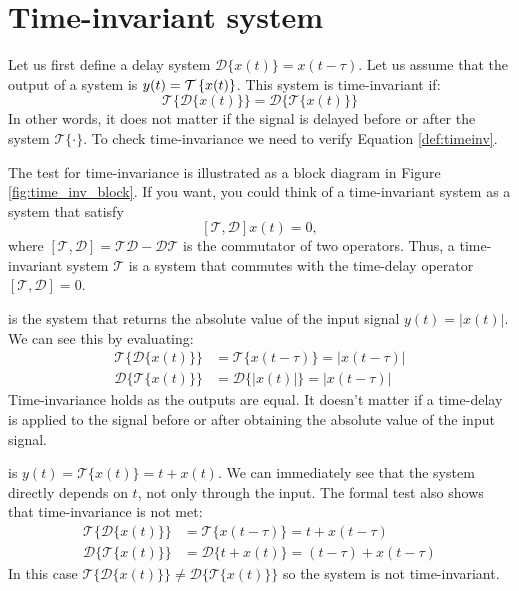 \section{Time-invariant system}

Let us first define a delay system $\mathcal{D}\{x(t)\} = x(t-\tau)$. Let us assume that the output of a system is $y(t) = \spop[x(t)]$. This system is time-invariant if:
\begin{equation}
\boxed{
\mathcal{T}\{\mathcal{D}\{x(t)\}\} = \mathcal{D}\{\mathcal{T}\{x(t)\}\}
\label{def:timeinv}
}
\end{equation}
In other words, it does not matter if the signal is delayed before or after the system $\mathcal{T}\{\cdot\}$. To check time-invariance we need to verify Equation \ref{def:timeinv}. 

The test for time-invariance is illustrated as a block diagram in Figure \ref{fig:time_inv_block}. If you want, you could think of a time-invariant system as a system that satisfy
$$[\mathcal{T},\mathcal{D}]x(t)=0,$$
where $[\mathcal{T},\mathcal{D}]=\mathcal{T}\mathcal{D}-\mathcal{D}\mathcal{T}$ is the commutator of two operators. Thus, a time-invariant system $\mathcal{T}$ is a system that commutes with the time-delay operator $[\mathcal{T},\mathcal{D}]=0$. 

 is the system that returns the absolute value of the input signal $y(t)=|x(t)|$. We can see this by evaluating:
\begin{align}
\mathcal{T}\{\mathcal{D}\{x(t)\}\} &= \mathcal{T}\{x(t-\tau)\}=|x(t-\tau)|\\
\mathcal{D}\{\mathcal{T}\{x(t)\}\} &= \mathcal{D}\{|x(t)|\}=|x(t-\tau)|
\end{align}
Time-invariance holds as the outputs are equal. It doesn't matter if a time-delay is applied to the signal before or after obtaining the absolute value of the input signal.

 is $y(t) = \mathcal{T}\{x(t)\} = t + x(t)$. We can immediately see that the system directly depends on $t$, not only through the input. The formal test also shows that time-invariance is not met:
\begin{align}
\mathcal{T}\{\mathcal{D}\{x(t)\}\} &= \mathcal{T}\{x(t-\tau)\}=t+x(t-\tau) \\
\mathcal{D}\{\mathcal{T}\{x(t)\}\} &= \mathcal{D}\{t + x(t)\}=(t-\tau)+x(t-\tau)
\end{align}
In this case $\mathcal{T}\{\mathcal{D}\{x(t)\}\}\neq\mathcal{D}\{\mathcal{T}\{x(t)\}\}$ so the system is not time-invariant.

